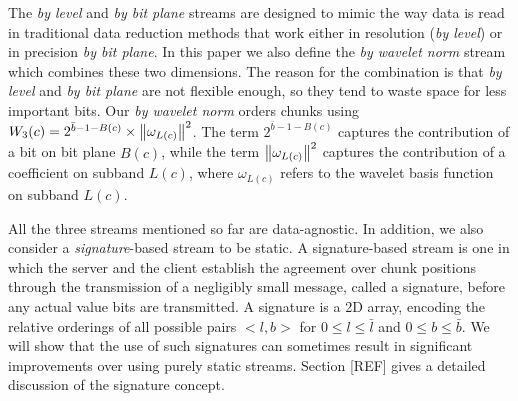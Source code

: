 The \emph{by level} and \emph{by bit plane} streams are designed to mimic the way data is read in
traditional data reduction methods that work either in resolution (\emph{by level}) or in precision
\emph{by bit plane}. In this paper we also define the \emph{by wavelet norm} stream which combines
these two dimensions. The reason for the combination is that \emph{by level} and \emph{by bit plane}
are not flexible enough, so they tend to waste space for less important bits. Our \emph{by wavelet
norm} orders chunks using $W_3(c)=2^{\bar{b}-1-B(c)}\times \left\lVert\omega_{L(c)}\right\rVert^2$. The term
$2^{\bar{b}-1-B(c)}$ captures the contribution of a bit on bit plane $B(c)$, while the term
$\left\lVert\omega_{L(c)}\right\rVert^2$ captures the contribution of a coefficient on subband $L(c)$, where
$\omega_{L(c)}$ refers to the wavelet basis function on subband $L(c)$.

All the three streams mentioned so far are data-agnostic. In addition, we also consider a
\emph{signature}-based stream to be static. A signature-based stream is one in which the server and
the client establish the agreement over chunk positions through the transmission of a negligibly
small message, called a signature, before any actual value bits are transmitted. A signature is a 2D
array, encoding the relative orderings of all possible pairs $<l,b>$ for $0\leq l \leq \bar{l}$ and
$0\leq b \leq \bar{b}$. We will show that the use of such signatures can sometimes result in
significant improvements over using purely static streams. Section [REF] gives a detailed discussion
of the signature concept.
